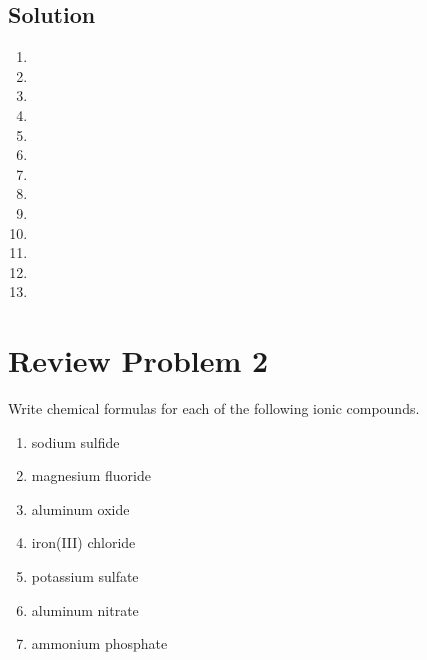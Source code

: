 \documentclass[10pt]{article}
\begin{document}
        \subsection{Solution}
            \begin{multicols}{4}
                \begin{enumerate}[label=\alph*)]
                    \item   {}
                    \item   {}
                    \item   {}
                    \item   {}
                    \item   {}
                    \item   {}
                    \item   {}
                    \item   {}
                    \item   {}
                    \item   {}
                    \item   {}
                    \item   {}
                    \item   {}
                \end{enumerate}
            \end{multicols}
    
    \pagebreak
    \section{Review Problem 2}
        Write chemical formulas for each of the following ionic compounds.
        \begin{multicols}{2}
            \begin{enumerate}[label=\alph*)]
                \item sodium sulfide 
                \item magnesium fluoride
                \item aluminum oxide
                \item iron(III) chloride 
                \item potassium sulfate
                \item aluminum nitrate
                \item ammonium phosphate
            \end{enumerate}
        \end{multicols}
\end{document}
